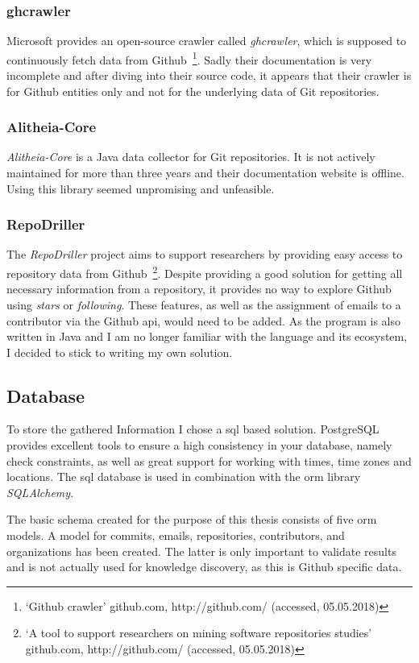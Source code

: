 \subsubsection{ghcrawler}
Microsoft provides an open-source crawler called \emph{ghcrawler}, which is supposed to continuously fetch data from Github~\footnote{`Github crawler' github.com, http://github.com/ (accessed, 05.05.2018)}.
Sadly their documentation is very incomplete and after diving into their source code, it appears that their crawler is for Github entities only and not for the underlying data of Git repositories.

\subsubsection{Alitheia-Core}
\emph{Alitheia-Core} is a Java data collector for Git repositories.
It is not actively maintained for more than three years and their documentation website is offline.
Using this library seemed unpromising and unfeasible.

\subsubsection{RepoDriller}
The \emph{RepoDriller} project aims to support researchers by providing easy access to repository data from Github~\footnote{`A tool to support researchers on mining software repositories studies' github.com, http://github.com/ (accessed, 05.05.2018)}.
Despite providing a good solution for getting all necessary information from a repository, it provides no way to explore Github using \emph{stars} or \emph{following}.
These features, as well as the assignment of emails to a contributor via the Github \ac{api}, would need to be added.
As the program is also written in Java and I am no longer familiar with the language and its ecosystem, I decided to stick to writing my own solution.

\subsection{Database}\label{gitalizer-database}
To store the gathered Information I chose a \ac{sql} based solution.
PostgreSQL provides excellent tools to ensure a high consistency in your database, namely check constraints, as well as great support for working with times, time zones and locations.
The \ac{sql} database is used in combination with the \ac{orm} library \emph{SQLAlchemy}.

The basic schema created for the purpose of this thesis consists of five \ac{orm} models.
A model for commits, emails, repositories, contributors, and organizations has been created.
The latter is only important to validate results and is not actually used for knowledge discovery, as this is Github specific data.

